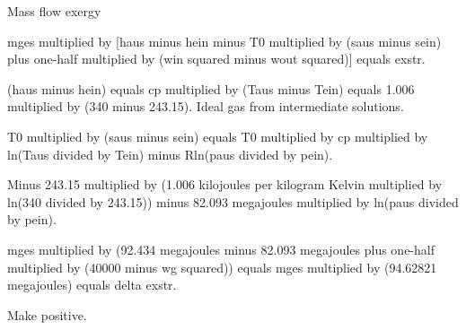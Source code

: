 Mass flow exergy  

mges multiplied by [haus minus hein minus T0 multiplied by (saus minus sein) plus one-half multiplied by (win squared minus wout squared)] equals exstr.  

(haus minus hein) equals cp multiplied by (Taus minus Tein) equals 1.006 multiplied by (340 minus 243.15).  
Ideal gas from intermediate solutions.  

T0 multiplied by (saus minus sein) equals T0 multiplied by cp multiplied by ln(Taus divided by Tein) minus Rln(paus divided by pein).  

Minus 243.15 multiplied by (1.006 kilojoules per kilogram Kelvin multiplied by ln(340 divided by 243.15)) minus 82.093 megajoules multiplied by ln(paus divided by pein).  

mges multiplied by (92.434 megajoules minus 82.093 megajoules plus one-half multiplied by (40000 minus wg squared)) equals mges multiplied by (94.62821 megajoules) equals delta exstr.  

Make positive.